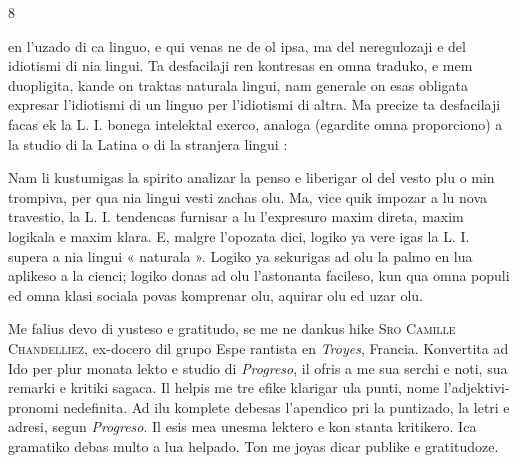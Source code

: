 \begin{VUpage}[12]{8}
\VUornement[16.68mm]{149.01mm}

\VUcontinue en l'uzado di ca linguo, e qui venas ne de ol ipsa, ma del\nl
neregulozaji e del idiotismi di nia lingui. Ta desfacilaji ren\cc
kontresas en omna traduko, e mem duopligita, kande on\nl
traktas naturala lingui, nam generale on esas obligata\nl
expresar l'idiotismi di un linguo per l'idiotismi di altra. Ma\nl
precize ta desfacilaji facas ek la L. I. bonega intelektal\nl
exerco, analoga (egardite omna proporciono) a la studio di\nl
la Latina o di la stranjera lingui :

Nam li kustumigas la spirito analizar la penso e liberigar\nl
ol del vesto plu o min trompiva, per qua nia lingui vesti\cc
zachas olu. Ma, vice quik impozar a lu nova travestio, la L. I.\nl
tendencas furnisar a lu l'expresuro maxim direta, maxim\nl
logikala e maxim klara. E, malgre l'opozata dici, logiko\nl
ya vere igas la L. I. supera a nia lingui « naturala ». Logiko\nl
ya sekurigas ad olu la palmo en lua aplikeso a la cienci;\nl
logiko donas ad olu l'astonanta facileso, kun qua omna\nl
populi ed omna klasi sociala povas komprenar olu, aquirar\nl
olu ed uzar olu.

\VUblanc{1.95mm}
\VUblanc{3.13mm}

Me falius devo di yusteso e gratitudo, se me ne dankus\nl
hike \textsc{Sro Camille Chandelliez}, ex-docero dil grupo Espe\cc
rantista en \textit{Troyes}, Francia. Konvertita ad Ido per plur\cc
monata lekto e studio di \textit{Progreso}, il ofris a me sua serchi e\nl
noti, sua remarki e kritiki sagaca. Il helpis me tre efike\nl
klarigar ula punti, nome l'adjektivi-pronomi nedefinita. Ad\nl
ilu komplete debesas l'apendico pri la puntizado, la letri e\nl
adresi, segun \textit{Progreso}. Il esis mea unesma lektero e kon\cc
stanta kritikero. Ica gramatiko debas multo a lua helpado.\nl
Ton me joyas dicar publike e gratitudoze.

\VUblanc{1.95mm}
\end{VUpage}

